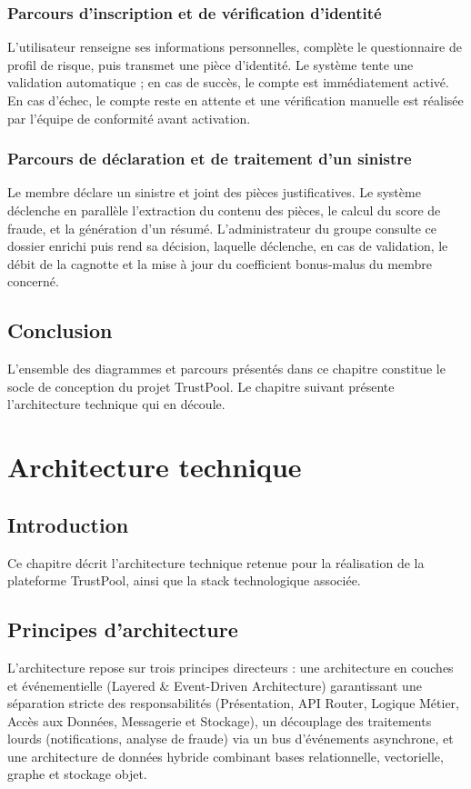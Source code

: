 \documentclass[12pt,a4paper]{report}
\begin{document}
\subsection{Parcours d'inscription et de vérification d'identité}
L'utilisateur renseigne ses informations personnelles, complète le questionnaire de profil de risque, puis transmet une pièce d'identité. Le système tente une validation automatique ; en cas de succès, le compte est immédiatement activé. En cas d'échec, le compte reste en attente et une vérification manuelle est réalisée par l'équipe de conformité avant activation.

\subsection{Parcours de déclaration et de traitement d'un sinistre}
Le membre déclare un sinistre et joint des pièces justificatives. Le système déclenche en parallèle l'extraction du contenu des pièces, le calcul du score de fraude, et la génération d'un résumé. L'administrateur du groupe consulte ce dossier enrichi puis rend sa décision, laquelle déclenche, en cas de validation, le débit de la cagnotte et la mise à jour du coefficient bonus-malus du membre concerné.

\section{Conclusion}
L'ensemble des diagrammes et parcours présentés dans ce chapitre constitue le socle de conception du projet TrustPool. Le chapitre suivant présente l'architecture technique qui en découle.

\newpage

\chapter{Architecture technique}

\section{Introduction}
Ce chapitre décrit l'architecture technique retenue pour la réalisation de la plateforme TrustPool, ainsi que la stack technologique associée.

\section{Principes d'architecture}
L'architecture repose sur trois principes directeurs : une architecture en couches et événementielle (Layered \& Event-Driven Architecture) garantissant une séparation stricte des responsabilités (Présentation, API Router, Logique Métier, Accès aux Données, Messagerie et Stockage), un découplage des traitements lourds (notifications, analyse de fraude) via un bus d'événements asynchrone, et une architecture de données hybride combinant bases relationnelle, vectorielle, graphe et stockage objet.
\end{document}
